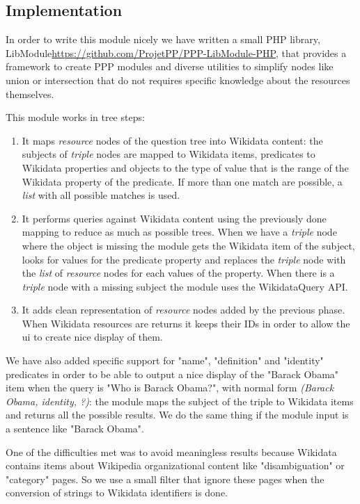 \subsection{Implementation}
In order to write this module nicely we have written a small PHP library, LibModule\url{https://github.com/ProjetPP/PPP-LibModule-PHP}, that provides a framework to create PPP modules and diverse utilities to simplify nodes like union or intersection that do not requires specific knowledge about the resources themselves.

This module works in tree steps:
\begin{enumerate}
    \item It maps \textit{resource} nodes of the question tree into Wikidata content: the subjects of \textit{triple} nodes are mapped to Wikidata items, predicates to Wikidata properties and objects to the type of value that is the range of the Wikidata property of the predicate. If more than one match are possible, a \textit{list} with all possible matches is used.
    \item It performs queries against Wikidata content using the previously done mapping to reduce as much as possible trees. When we have a \textit{triple} node where the object is missing the module gets the Wikidata item of the subject, looks for values for the predicate property and replaces the \textit{triple} node with the \textit{list} of \textit{resource} nodes for each values of the property. When there is a \textit{triple} node with a missing subject the module uses the WikidataQuery API.
    \item It adds clean representation of \textit{resource} nodes added by the previous phase. When Wikidata resources are returns it keeps their IDs in order to allow the ui to create nice display of them.
\end{enumerate}

We have also added specific support for "name", "definition" and "identity" predicates in order to be able to output a nice display of the "Barack Obama" item when the query is "Who is Barack Obama?", with normal form \textit{(Barack Obama, identity, ?)}: the module maps the subject of the triple to Wikidata items and returns all the possible results. We do the same thing if the module input is a sentence like "Barack Obama".

One of the difficulties met was to avoid meaningless results because Wikidata contains items about Wikipedia organizational content like "disambiguation" or "category" pages. So we use a small filter that ignore these pages when the conversion of strings to Wikidata identifiers is done.

